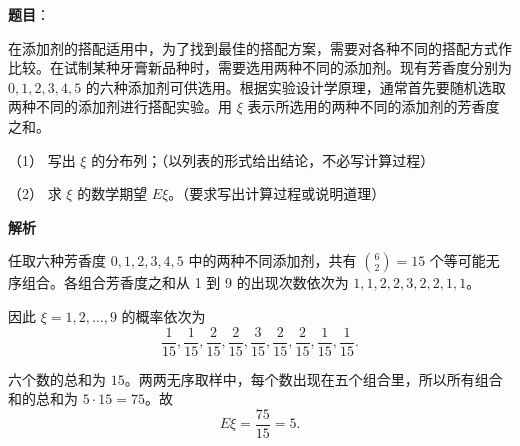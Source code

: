 \begin{answer}

\textbf{题目}：

在添加剂的搭配适用中，为了找到最佳的搭配方案，需要对各种不同的搭配方式作比较。在试制某种牙膏新品种时，需要选用两种不同的添加剂。现有芳香度分别为 $0,1,2,3,4,5$ 的六种添加剂可供选用。根据实验设计学原理，通常首先要随机选取两种不同的添加剂进行搭配实验。用 $\xi$ 表示所选用的两种不同的添加剂的芳香度之和。

（1） 写出 $\xi$ 的分布列；（以列表的形式给出结论，不必写计算过程）

（2） 求 $\xi$ 的数学期望 $E\xi$。（要求写出计算过程或说明道理）

\textbf{解析}

任取六种芳香度 $0,1,2,3,4,5$ 中的两种不同添加剂，共有 $\binom62=15$ 个等可能无序组合。各组合芳香度之和从 1 到 9 的出现次数依次为 $1,1,2,2,3,2,2,1,1$。


因此 $\xi=1,2,\ldots,9$ 的概率依次为
\nopagebreak[4]
\[
\frac1{15},\frac1{15},\frac2{15},\frac2{15},\frac3{15},
\frac2{15},\frac2{15},\frac1{15},\frac1{15}.
\]


六个数的总和为 $15$。两两无序取样中，每个数出现在五个组合里，所以所有组合和的总和为 $5\cdot15=75$。故
\nopagebreak[4]
\[
E\xi=\frac{75}{15}=5.
\]



\end{answer}
